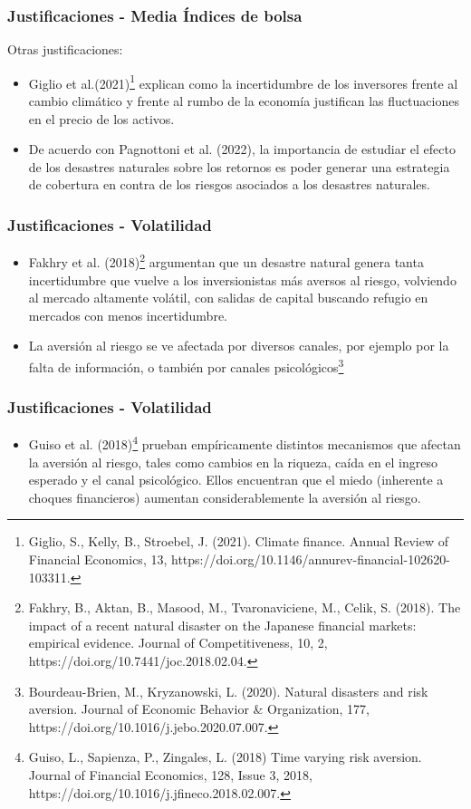 \documentclass{beamer}
\begin{document}
\begin{frame}
\frametitle{Justificaciones - Media Índices de bolsa}
Otras justificaciones:
\begin{itemize}
    \item Giglio et al.(2021)\footnote{Giglio, S., Kelly, B., Stroebel, J. (2021). Climate finance. Annual Review of Financial Economics, 13, https://doi.org/10.1146/annurev-financial-102620-103311.} explican como la incertidumbre de los inversores frente al cambio climático y frente al rumbo de la economía justifican las fluctuaciones en el precio de los activos.
    \item De acuerdo con Pagnottoni et al. (2022), la importancia de estudiar el efecto de los desastres naturales sobre los retornos es poder generar una estrategia de cobertura en contra de los riesgos asociados a los desastres naturales.
\end{itemize}
\end{frame}

\begin{frame}
\frametitle{Justificaciones - Volatilidad}
\begin{itemize}
    \item Fakhry et al. (2018)\footnote{Fakhry, B., Aktan, B., Masood, M., Tvaronaviciene, M., Celik, S. (2018). The impact of a recent natural disaster on the Japanese financial markets: empirical evidence. Journal of Competitiveness, 10, 2,  https://doi.org/10.7441/joc.2018.02.04.} argumentan que un desastre natural genera tanta incertidumbre que vuelve a los inversionistas más aversos al riesgo, volviendo al mercado altamente volátil, con salidas de capital buscando refugio en mercados con menos incertidumbre.
    \item La aversión al riesgo se ve afectada por diversos canales, por ejemplo por la falta de información, o también por canales psicológicos\footnote{Bourdeau-Brien, M., Kryzanowski, L. (2020). Natural disasters and risk aversion. Journal of Economic Behavior \& Organization, 177, https://doi.org/10.1016/j.jebo.2020.07.007.}
\end{itemize}
\end{frame}

\begin{frame}
\frametitle{Justificaciones - Volatilidad}
\begin{itemize}
    \item Guiso et al. (2018)\footnote{Guiso, L., Sapienza, P., Zingales, L. (2018) Time varying risk aversion. Journal of Financial Economics, 128, Issue 3, 2018, https://doi.org/10.1016/j.jfineco.2018.02.007.} prueban empíricamente distintos mecanismos que afectan la aversión al riesgo, tales como cambios en la riqueza, caída en el ingreso esperado y el canal psicológico. Ellos encuentran que el miedo (inherente a choques financieros) aumentan considerablemente la aversión al riesgo.
\end{itemize}
\end{frame}
\end{document}
